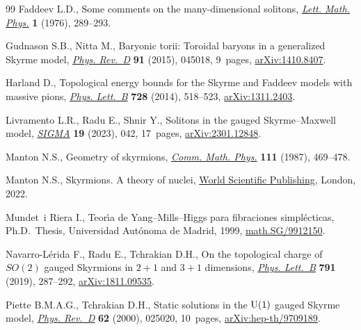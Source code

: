 \documentclass[pdftex]{sigma}
\newcommand{\1}{{\mathbb{1}}}
\numberwithin{equation}{section}
\begin{document}
\begin{thebibliography}{99}
Faddeev L.D., Some comments on the many-dimensional solitons, \href{https://doi.org/10.1007/BF00398483}{\textit{Lett.
 Math. Phys.}} \textbf{1} (1976), 289--293.

Gudnason S.B., Nitta M., Baryonic torii: {T}oroidal baryons in a generalized
 {S}kyrme model, \href{https://doi.org/10.1103/PhysRevD.91.045027}{\textit{Phys. Rev.~D}} \textbf{91} (2015), 045018, 9~pages,
 \href{https://arxiv.org/abs/1410.8407}{arXiv:1410.8407}.

Harland D., Topological energy bounds for the {S}kyrme and {F}addeev models
 with massive pions, \href{https://doi.org/10.1016/j.physletb.2013.11.062}{\textit{Phys. Lett.~B}} \textbf{728} (2014), 518--523,
 \href{https://arxiv.org/abs/1311.2403}{arXiv:1311.2403}.

Livramento L.R., Radu E., Shnir Y., Solitons in the gauged {S}kyrme--{M}axwell
 model, \href{https://doi.org/10.3842/SIGMA.2023.042}{\textit{SIGMA}} \textbf{19}
 (2023), 042, 17~pages, \href{https://arxiv.org/abs/2301.12848}{arXiv:2301.12848}.

Manton N.S., Geometry of skyrmions, \href{https://doi.org/10.1007/BF01238909}{\textit{Comm. Math. Phys.}} \textbf{111}
 (1987), 469--478.

Manton N.S., Skyrmions. {A} theory of nuclei, \href{https://doi.org/10.1142/q0368}{World Scientific Publishing},
 London, 2022.

Mundet~i Riera I., Teor\'{\i}a de {Y}ang--{M}ills--{H}iggs para fibraciones simpl\'ecticas, Ph.D.~Thesis, {U}niversidad {A}ut\'onoma de {M}adrid, 1999,
 \href{https://arxiv.org/abs/math.SG/9912150}{math.SG/9912150}.

Navarro-L\'erida F., Radu E., Tchrakian D.H., On the topological charge of
 {$SO(2)$} gauged {S}kyrmions in {$2+1$} and {$3+1$} dimensions, \href{https://doi.org/10.1016/j.physletb.2019.02.011}{\textit{Phys.
 Lett.~B}} \textbf{791} (2019), 287--292, \href{https://arxiv.org/abs/1811.09535}{arXiv:1811.09535}.

Piette B.M.A.G., Tchrakian D.H., Static solutions in the {${\rm U}(1)$} gauged
 {S}kyrme model, \href{https://doi.org/10.1103/PhysRevD.62.025020}{\textit{Phys. Rev.~D}} \textbf{62} (2000), 025020, 10~pages,
 \href{https://arxiv.org/abs/hep-th/9709189}{arXiv:hep-th/9709189}.


\end{thebibliography}
\end{document}
